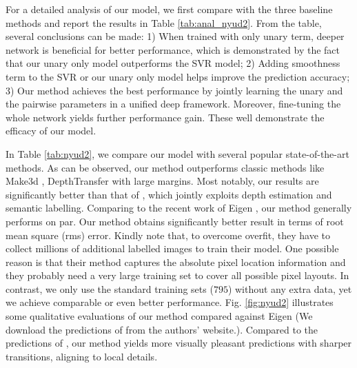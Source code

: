 For a detailed analysis of our model, we first compare with the three baseline methods and report the results in Table \ref{tab:anal_nyud2}. 
From the table, several conclusions can be made: 1) When trained with only unary term, deeper network is beneficial for better performance, which is demonstrated by the fact that our unary only model outperforms the SVR model;
2) Adding smoothness term to the SVR or our unary only model helps improve the prediction accuracy;
3) Our method achieves the best performance by jointly learning the unary and the pairwise parameters in a unified deep \cnn framework. Moreover, fine-tuning the whole network yields further performance gain.
These well demonstrate the efficacy of our model.
%
%
%
























In Table \ref{tab:nyud2}, we compare our model with several popular state-of-the-art methods.  
As can be observed, our method outperforms classic methods like Make3d \cite{make3d_pami09}, DepthTransfer \cite{depthTransfer_pami14} with large margins. 
Most notably, our results are significantly better than that of \cite{Ladicky_cvpr14}, which jointly exploits depth estimation and semantic labelling. 
Comparing to the recent work of Eigen \etal \cite{dcnn_nips14}, our method generally performs on par.
Our method obtains significantly better result in terms of root mean square (rms) error.
%
%
%
%
%
Kindly note that, to overcome overfit, they \cite{dcnn_nips14} have to collect millions of additional labelled images to train their model. One possible reason is that their method captures the absolute pixel location information and they probably need a very large training set to cover all possible pixel layouts.
In contrast, we only use the standard training sets ($795$) without any extra data,  
yet we achieve comparable or even better performance.
Fig. \ref{fig:nyud2} illustrates some qualitative evaluations of our method compared against Eigen \etal \cite{dcnn_nips14} (We download the predictions of \cite{dcnn_nips14} from the authors' website.). 
%
%
Compared to the predictions of \cite{dcnn_nips14},
our method yields more visually pleasant predictions with sharper transitions, aligning to local details.


